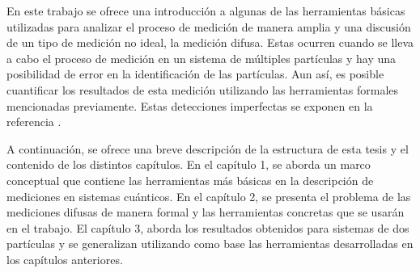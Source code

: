 \documentclass[12pt,oneside]{book}\raggedbottom{} %
\begin{document}
\begin{sloppypar}
{{%
En este trabajo se ofrece una introducción a algunas de las herramientas básicas utilizadas para analizar el proceso de medición de manera amplia y una discusión de un tipo de medición no ideal, la medición difusa. Estas ocurren cuando se lleva a cabo el proceso de medición en un sistema de múltiples partículas y hay una posibilidad de error en la identificación de las partículas. Aun así, es posible cuantificar los resultados de esta medición utilizando las herramientas formales mencionadas previamente. Estas detecciones imperfectas se exponen en la referencia {\cite{Pineda_2021}}. %

  
A continuación, se ofrece una breve descripción de la estructura de esta tesis y el contenido de los distintos capítulos.  En el capítulo 1, se aborda un marco conceptual que contiene las herramientas más básicas en la descripción de mediciones en sistemas cuánticos. En el capítulo 2, se presenta el problema de las mediciones difusas de manera formal y las herramientas concretas que se usarán en el trabajo. El capítulo 3, aborda los resultados obtenidos para sistemas de dos partículas y se generalizan utilizando como base las herramientas desarrolladas en los capítulos anteriores. 















}}
\end{sloppypar}
\end{document}
